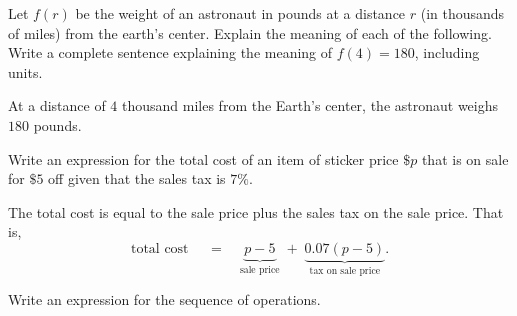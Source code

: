 \documentclass{exam}
\begin{document}
\begin{questions}
\question Let $f(r)$ be the weight of an astronaut in pounds at a distance $r$ (in thousands of miles) from the earth's center. Explain the meaning of each of the following. Write a complete sentence explaining the meaning of $f(4)=180$, including units.

\begin{solution}[4em]
At a distance of $4$ thousand miles from the Earth's center, the astronaut weighs $180$ pounds.
\end{solution}



\question Write an expression for the total cost of an item of sticker price $\$p$ that is on sale for $\$5$ off given that the sales tax is $7\%$.


\begin{solution}[6em]
The total cost is equal to the sale price plus the sales tax on the sale price. That is,
\[
\text{total cost } \quad=\quad \underbrace{p-5}_\text{sale price} \;+\; \underbrace{0.07(p-5)}_\text{tax on sale price}   
.\] 
\end{solution}


\question Write an expression for the sequence of operations.

\end{questions}
\end{document}
